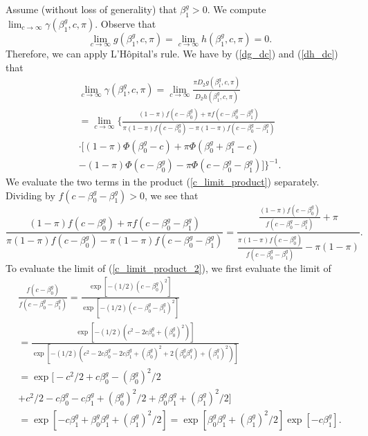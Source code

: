 \documentclass[12pt]{article}
\begin{document}
\begin{appendices}
Assume (without loss of generality) that $\beta^g_1 > 0$. We compute $\lim_{c \to \infty} \gamma(\beta^g_1, c, \pi)$. Observe that $$\lim_{c \to \infty} g(\beta^g_1, c, \pi) = \lim_{c \to \infty} h(\beta^g_1, c, \pi)  = 0.$$ Therefore, we can apply L'H\^{o}pital's rule. We have by (\ref{dg_dc}) and (\ref{dh_dc}) that \begin{multline}\label{c_limit_product}
\lim_{c \to \infty} \gamma(\beta^g_1, c, \pi) = \lim_{c \to \infty} \frac{\pi D_2 g(\beta^g_1, c, \pi)}{D_2h(\beta^g_1, c, \pi)} \\ = \lim_{c \to \infty} \bigg\{ \frac{(1-\pi) f(c - \beta^g_0) + \pi f(c - \beta^g_0 - \beta^g_1)}{\pi (1-\pi) f(c - \beta^g_0) - \pi (1-\pi)f(c - \beta^g_0 - \beta^g_1)} \\ \cdot \bigg[ (1-\pi) \Phi(\beta_0^g - c) + \pi \Phi(\beta^g_0 + \beta^g_1 - c) \\ - (1-\pi) \Phi(c - \beta^g_0) - \pi \Phi(c - \beta_0^g - \beta_1^g) \bigg] \bigg\}^{-1}.
 \end{multline}
 We evaluate the two terms in the product (\ref{c_limit_product}) separately. Dividing by $f(c - \beta^g_0 - \beta^g_1) > 0$, we see that
 \begin{equation}\label{c_limit_product_2}
 \frac{(1-\pi) f(c - \beta^g_0) + \pi f(c - \beta^g_0 - \beta^g_1)}{\pi (1-\pi) f(c - \beta^g_0) - \pi (1-\pi)f(c - \beta^g_0 - \beta^g_1)} = \frac{\frac{(1-\pi) f(c - \beta^g_0)}{ f(c - \beta^g_0 - \beta^g_1)} + \pi}{\frac{ \pi(1-\pi) f(c - \beta^g_0)}{ f(c - \beta^g_0 - \beta^g_1)} - \pi(1-\pi)}.
 \end{equation}
 To evaluate the limit of (\ref{c_limit_product_2}), we first evaluate the limit of
 \begin{multline}\label{c_limit_product_3}
 \frac{f(c - \beta^g_0)}{f(c - \beta^g_0 - \beta^g_1)} = \frac{\exp{[-(1/2)(c - \beta_0^g)^2]}}{\exp{[-(1/2)( c - \beta^g_0 - \beta^g_1)^2]}} \\ = \frac{\exp[ -(1/2)(c^2 - 2 c \beta^g_0 + (\beta^g_0)^2)]}{\exp\left[-(1/2)( c^2 - 2c \beta^g_0 - 2 c \beta^g_1 + (\beta^g_0)^2 + 2( \beta^g_0 \beta^g_1) + (\beta^g_1)^2)\right]} \\ = \exp\big[-c^2/2 + c \beta^g_0 - (\beta^g_0)^2/2 \\ + c^2/2 - c \beta^g_0 - c \beta^g_1 + (\beta^g_0)^2/2 + \beta^g_0 \beta^g_1 + (\beta^g_1)^2/2 \big] \\ = \exp[ -c \beta^g_1 + \beta^g_0 \beta^g_1 + (\beta^g_1)^2/2] = \exp[ \beta^g_0 \beta^g_1 + (\beta^g_1)^2/2]\exp[ -c \beta^g_1]. 
\end{multline}

\end{appendices}
\end{document}

